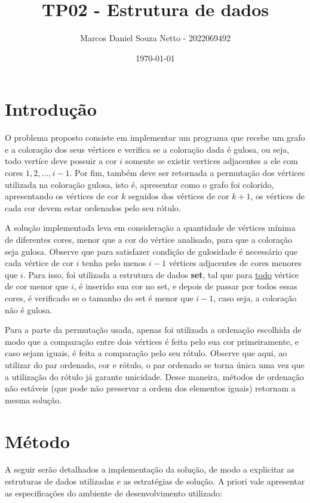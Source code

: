\documentclass{article}
\title{TP02 - Estrutura de dados}
\author{Marcos Daniel Souza Netto - 2022069492}
\date{\today}
\begin{document}
\maketitle

\section{Introdução}

O problema proposto consiste em implementar um programa que recebe um grafo 
e a coloração dos seus vértices e verifica se a coloração dada é gulosa, ou seja,
todo vertíce deve possuir a cor $i$ somente se existir vertices adjacentes
a ele com cores $1, 2, ..., i-1$. Por fim, também deve ser retornada a permutação
dos vértices utilizada na coloração gulosa, isto é, apresentar como o grafo foi 
colorido, apresentando os vértices de cor $k$ seguidos dos vértices de cor $k + 1$, 
os vértices de cada cor devem estar ordenados pelo seu rótulo.

A solução implementada leva em consideração a quantidade de vértices mínima de diferentes cores, 
menor que a cor do vértice analisado, para que a coloração seja gulosa. Observe que para satisfazer 
condição de gulosidade é necessário que cada vértice de cor $i$ tenha pelo menos $i-1$ vértices adjacentes 
de cores menores que $i$. Para isso, foi utilizada a estrutura de dados \textbf{set}, tal que para \underline{todo} vértice
de cor menor que $i$, é inserido sua cor no set, e depois de passar por todos essas cores, é verificado se o tamanho do set 
é menor que $i-1$, caso seja, a coloração não é gulosa.

Para a parte da permutação usada, apenas foi utilizada a ordenação escolhida de modo que a comparação entre dois vértices é feita 
pelo sua cor primeiramente, e caso sejam iguais, é feita a comparação pelo seu rótulo. Observe que aqui, ao utilizar do par ordenado, cor e rótulo, 
o par ordenado se torna única uma vez que a utilização do rótulo já garante unicidade. Desse maneira, métodos de ordenação não estáveis (que pode não preservar a ordem dos elementos iguais) retornam 
a mesma solução. 

\section{Método}

A seguir serão detalhados a implementação da solução, de modo a explicitar 
as estruturas de dados utilizadas e as estratégias de solução. A priori vale 
apresentar as especificações do ambiente de desenvolvimento utilizado:
\end{document}
